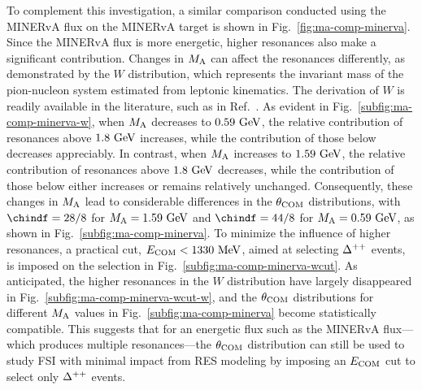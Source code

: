      To complement this investigation, a similar comparison conducted using the MINERvA flux on the MINERvA target is shown in Fig.~\ref{fig:ma-comp-minerva}. 
     Since the MINERvA flux is more energetic, higher resonances also make a significant contribution.
     Changes in $M_{\textrm{A}}$ can affect the resonances differently, as demonstrated by the $W$ distribution, which represents the invariant mass of the pion-nucleon system estimated from leptonic kinematics. 
     The derivation of $W$ is readily available in the literature, such as in Ref.~\cite{Paschos:2003qr}.
     As evident in Fig.~\ref{subfig:ma-comp-minerva-w}, when $M_{\textrm{A}}$ decreases to $0.59~\textrm{GeV}$, the relative contribution of resonances above $1.8~\textrm{GeV}$ increases, while the contribution of those below decreases appreciably.
     In contrast, when $M_{\textrm{A}}$ increases to $1.59~\textrm{GeV}$, the relative contribution of resonances above $1.8~\textrm{GeV}$ decreases, while the contribution of those below either increases or remains relatively unchanged.
     Consequently, these changes in $M_{\textrm{A}}$ lead to considerable differences in the $\theta_{\textrm{COM}}$ distributions, with $\chindf=28/8$ for $M_{\textrm{A}}=1.59~\textrm{GeV}$ and $\chindf=44/8$ for $M_{\textrm{A}}=0.59~\textrm{GeV}$, as shown in Fig.~\ref{subfig:ma-comp-minerva}.
     To minimize the influence of higher resonances, a practical cut, $E_{\textrm{COM}}<1330~\textrm{MeV}$, aimed at selecting $\Delta^{++}$ events, is imposed on the selection in Fig.~\ref{subfig:ma-comp-minerva-wcut}.
     As anticipated, the higher resonances in the $W$ distribution have largely disappeared in Fig.~\ref{subfig:ma-comp-minerva-wcut-w}, and the $\theta_{\textrm{COM}}$ distributions for different $M_{\textrm{A}}$ values in Fig.~\ref{subfig:ma-comp-minerva} become statistically compatible.
     This suggests that for an energetic flux such as the MINERvA flux—which produces multiple resonances—the $\theta_{\textrm{COM}}$ distribution can still be used to study FSI with minimal impact from RES modeling by imposing an $E_{\textrm{COM}}$ cut to select only $\Delta^{++}$ events.

